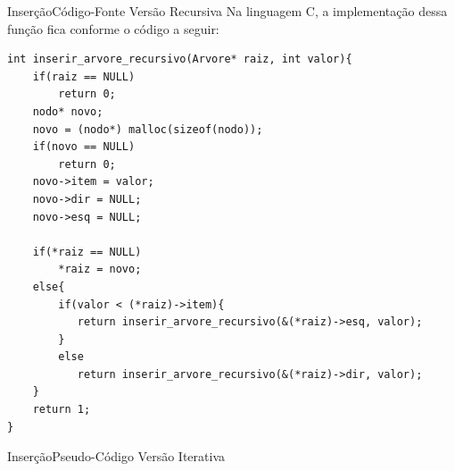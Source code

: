 \documentclass[aspectratio=169]{beamer}
\begin{document}

\begin{frame}[fragile]{Inserção}{Código-Fonte Versão Recursiva}
Na linguagem C, a implementação dessa função fica conforme o código a seguir:
\begin{lstlisting}[style=CStyle,basicstyle=\tiny]
int inserir_arvore_recursivo(Arvore* raiz, int valor){
    if(raiz == NULL)
        return 0;
    nodo* novo;
    novo = (nodo*) malloc(sizeof(nodo));
    if(novo == NULL)
        return 0;
    novo->item = valor;
    novo->dir = NULL;
    novo->esq = NULL;

    if(*raiz == NULL)
        *raiz = novo;
    else{        
        if(valor < (*raiz)->item){
           return inserir_arvore_recursivo(&(*raiz)->esq, valor);
        }
        else
           return inserir_arvore_recursivo(&(*raiz)->dir, valor);
    }
    return 1;
}
\end{lstlisting}  
\end{frame}


\begin{frame}{Inserção}{Pseudo-Código Versão Iterativa}
\end{frame}
\end{document}
